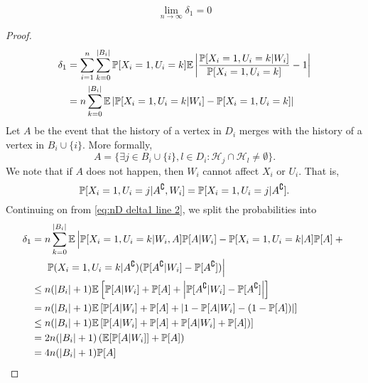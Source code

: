 \begin{lemma}
\label{lem:delta1 goes to 0 general}
	\begin{equation}
		\lim_{n\rightarrow\infty} \delta_1 = 0
	\end{equation}
\end{lemma}
\begin{proof}
	\begin{align}
		\delta_1 &= \sum_{i = 1}^n \sum_{k = 0}^{|B_i|} \prob[X_i = 1, U_i = k] \expect \left| \frac{\prob[X_i = 1, U_i = k|W_i]}{\prob[X_i = 1, U_i = k]} - 1 \right|\\
		&= n \sum_{k = 0}^{|B_i|} \expect \left|\prob[X_i = 1, U_i = k|W_i] - \prob[X_i = 1, U_i = k] \right|%
		\label{eq:nD delta1 line 2}
	\end{align}
	Let $A$ be the event that the history of a vertex in $D_i$ merges with the history of a vertex in $B_i \cup \{i\}$. More formally,
	\begin{equation}
		A = \{ \exists j \in B_i \cup \{i\}, l \in D_i : \mathcal{H}_j \cap \mathcal{H}_l \neq \emptyset\}.
	\end{equation}
	We note that if $A$ does not happen, then $W_i$ cannot affect $X_i$ or $U_i$. That is,
	\begin{equation}
		\mathbb{P}[X_i = 1, U_i = j | A^\complement, W_i] = \mathbb{P}[X_i = 1, U_i = j | A^\complement].
	\end{equation} 
	Continuing on from \eqref{eq:nD delta1 line 2}, we split the probabilities into
	\begin{align}
		\delta_1 &= n \sum_{k = 0}^{|B_i|} \mathbb{E} \left| \mathbb{P}[X_i = 1, U_i = k|W_i, A]\mathbb{P}[A|W_i] - \mathbb{P}[X_i = 1, U_i = k| A]\mathbb{P}[A] + \vphantom{A^\complement} \right.\\
		&\hphantom{= .} \left.\mathbb{P}(X_i = 1, U_i = k | A^\complement) (\mathbb{P}[A^\complement|W_i] - \mathbb{P}[A^\complement]) \right| \notag \\
		&\leq n (|B_i| + 1) \mathbb{E}\left[ \mathbb{P}[A|W_i] + \mathbb{P}[A] + \left|\mathbb{P}[A^\complement|W_i] - \mathbb{P}[A^\complement]\right|\right]\\
		&= n (|B_i| + 1) \mathbb{E}\left[ \mathbb{P}[A|W_i] + \mathbb{P}[A] + \left|1 - \mathbb{P}[A|W_i] - (1 - \mathbb{P}[A])\right|\right]\\
		&\leq n (|B_i| + 1) \mathbb{E}\left[ \mathbb{P}[A|W_i] + \mathbb{P}[A] + \mathbb{P}[A|W_i] + \mathbb{P}[A])\right]\\
		&= 2 n (|B_i| + 1) \left(\mathbb{E}[\mathbb{P}[A|W_i]] + \mathbb{P}[A]\right)\\
		&= 4 n (|B_i| + 1) \mathbb{P}[A]
	\end{align}


\end{proof}

